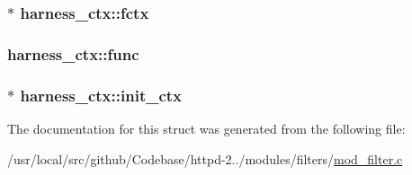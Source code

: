 \subsubsection[{\texorpdfstring{fctx}{fctx}}]{$\ast$ harness\+\_\+ctx\+::fctx}\hypertarget{structharness__ctx_a29824598296f9f6ceb68137153400ba6}{}\label{structharness__ctx_a29824598296f9f6ceb68137153400ba6}
\subsubsection[{\texorpdfstring{func}{func}}]{ harness\+\_\+ctx\+::func}\hypertarget{structharness__ctx_a03f0d2120c19cd859c01a8ceb1e81816}{}\label{structharness__ctx_a03f0d2120c19cd859c01a8ceb1e81816}
\subsubsection[{\texorpdfstring{init\+\_\+ctx}{init_ctx}}]{$\ast$ harness\+\_\+ctx\+::init\+\_\+ctx}\hypertarget{structharness__ctx_a460c327d5b6a4230a87521930c8f4e9f}{}\label{structharness__ctx_a460c327d5b6a4230a87521930c8f4e9f}


The documentation for this struct was generated from the following file\+:\begin{DoxyCompactItemize}
\item 
/usr/local/src/github/\+Codebase/httpd-\/2../modules/filters/\hyperlink{mod__filter_8c}{mod\+\_\+filter.\+c}\end{DoxyCompactItemize}
